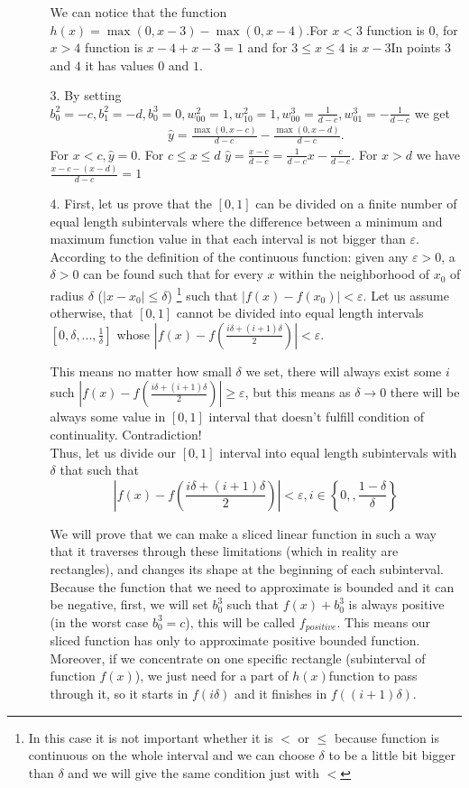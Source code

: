 \documentclass[10pt,a4paper]{article}
\begin{document}
\begin{enumerate}
\begin{enumerate}
We can notice that the function 
$h(x) = \max(0, x-3) - \max(0, x - 4)$.For $x<3$ function is 0, for $x> 4$ function is $x-4 + x-3 = 1$ and for $3\leq x\leq4$  is $x-3$In points $3$ and $4$ it has values $0$ and $1$.
\item[3.]
By setting $b_0^2=-c, b_1^2=-d, b_0^3=0, w_{00}^2=1, w_{10}^2=1, w_{00}^3=\frac{1}{d-c}, w_{01}^3=-\frac{1}{d-c}$ we get 
\begin{align*}
\hat{y} = \frac{\max(0, x-c)}{d-c} - \frac{\max(0, x-d)}{d-c}.
\end{align*} 
For $x<c, \hat{y}=0$. 
For $c\leq x\leq d$ $\hat{y}=\frac{x-c}{d-c}=\frac{1}{d-c}x - \frac{c}{d-c}$. For $x > d$ we have $\frac{x-c - (x - d)}{d-c}=1$
\item[4.]
First, let us prove that the $[0, 1]$ can be divided on a finite number of equal length subintervals where the difference between a minimum and maximum function value in that each interval is not bigger than $\varepsilon$.\\

According to the definition of the continuous function: given any $\varepsilon>0$, a $\delta>0$ can be found such that for every $x$ within the neighborhood of $x_0$ of radius $\delta$ ($|x-x_0|\leq\delta$)
\footnote{In this case it is not important whether it is $<$ or $\leq$ because function is continuous on the whole interval and we can choose $\delta$ to be a little bit bigger than $\delta$ and we will give the same condition just with $<$} 
such that $|f(x)-f(x_0)|<\varepsilon$. 
Let us assume otherwise, that  $[0,1]$ cannot be divided into equal length intervals $[0, \delta, ..., \frac{1}{\delta}]$
whose $|f(x)-f(\frac{i\delta + (i+1)\delta}{2})|<\varepsilon$. 

This means no matter how small $\delta$ we set, there will always exist some $i$ such $|f(x)-f(\frac{i\delta + (i+1)\delta}{2})|\geq \varepsilon$, but this means as $\delta \rightarrow 0$ there will be always some value in $[0,1]$ interval that doesn't fulfill condition of continuality. Contradiction! \\
Thus, let us divide our $[0,1]$ interval into equal length subintervals with $\delta$ that such that   $$\left|f(x)-f\left(\frac{i\delta + (i+1)\delta}{2}\right)\right|<\varepsilon, i \in \left\{ 0, , \frac{1-\delta}{\delta}\right\}$$

We will prove that we can make a sliced linear function in such a way that it traverses through these limitations (which in reality are rectangles), and changes its shape at the beginning of each subinterval.
Because the function that we need to approximate is bounded and it can be negative, first, we will set $b_0^3$ such that $f(x)+b_0^3$ is always positive (in the worst case $b_0^3 = c$), this will be called $f_{positive}$. This means our sliced function has only to approximate positive bounded function. Moreover, if we concentrate on one specific rectangle (subinterval of function $f(x)$), we just need for a part of $h(x)$function to pass through it, so it starts in $f(i\delta)$ and it finishes in $f((i+1)\delta)$. 


\end{enumerate}
\end{enumerate}
\end{document}
